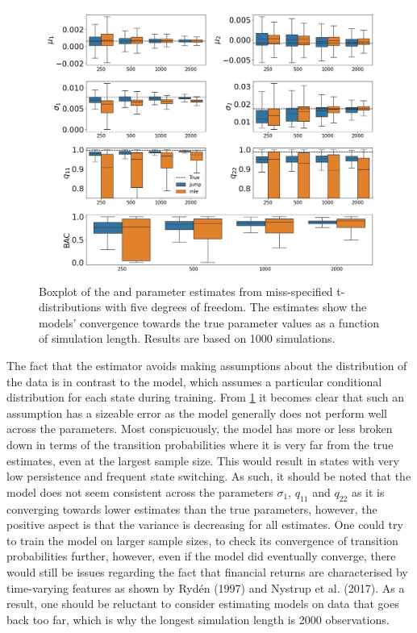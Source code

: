 \begin{figure}[H] 
    \centering
    \includegraphics[width=1\textwidth]{analysis/model_convergence/images/simulation_t_box.png}
    
    \caption [Boxplot of \mle and \jump parameter estimates from miss-specified conditional t-distributions with five degrees of freedom] {Boxplot of the \mle and \jump parameter estimates from miss-specified t-distributions with five degrees of freedom. The estimates show the models' convergence towards the true parameter values as a function of simulation length. Results are based on 1000 simulations.}
    \label{fig:jump_t_box}
\end{figure}

The fact that the \jump estimator avoids making assumptions about the distribution of the data is in contrast to the \mle model, which assumes a particular conditional distribution for each state during training. From \cref{fig:jump_t_box} it becomes clear that such an assumption has a sizeable error as the model generally does not perform well across the parameters. Most conspicuously, the \mle model has more or less broken down in terms of the transition probabilities where it is very far from the true estimates, even at the largest sample size. This would result in states with very low persistence and frequent state switching. As such, it should be noted that the \mle model does not seem consistent across the parameters $\sigma_1$, $q_{11}$ and $q_{22}$ as it is converging towards lower estimates than the true parameters, however, the positive aspect is that the variance is decreasing for all estimates. One could try to train the \mle model on larger sample sizes, to check its convergence of transition probabilities further, however, even if the model did eventually converge, there would still be issues regarding the fact that financial returns are characterised by time-varying features as shown by Rydén (1997) and Nystrup et al. (2017). As a result, one should be reluctant to consider estimating models on data that goes back too far, which is why the longest simulation length is 2000 observations. 

